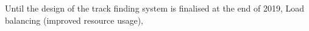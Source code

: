 Until the design of the track finding system is finalised at the end of 2019, 
Load balancing (improved resource usage), 


%
